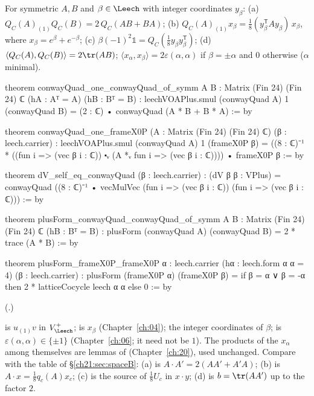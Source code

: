\begin{theorem}\label{ch21:thm:conway}
For symmetric $A,B$ and $\beta\in\Leech$ with integer coordinates $y_\beta$:
(a) $Q_C(A)_{(1)}Q_C(B)=2\,Q_C(AB+BA)$;
(b) $Q_C(A)_{(1)}x_\beta=\tfrac18(y_\beta^{\mathsf T}Ay_\beta)\,x_\beta$, where $x_\beta=e^\beta+e^{-\beta}$;
(c) $\beta(-1)^2\mathbb1=Q_C(\tfrac18y_\beta y_\beta^{\mathsf T})$;
(d) $\langle Q_C(A),Q_C(B)\rangle=2\tr(AB)$; $\langle x_\alpha,x_\beta\rangle=2\varepsilon(\alpha,\alpha)$ if
$\beta=\pm\alpha$ and $0$ otherwise ($\alpha$ minimal).
\end{theorem}
\begin{leancode}
theorem conwayQuad_one_conwayQuad_of_symm {A B : Matrix (Fin 24) (Fin 24) ℂ} (hA : Aᵀ = A)
    (hB : Bᵀ = B) :
    leechVOAPlus.smul (conwayQuad A) 1 (conwayQuad B) = (2 : ℂ) • conwayQuad (A * B + B * A) := by
\end{leancode}
\begin{leancode}
theorem conwayQuad_one_frameX0P (A : Matrix (Fin 24) (Fin 24) ℂ) (β : leech.carrier) :
    leechVOAPlus.smul (conwayQuad A) 1 (frameX0P β)
      = ((8 : ℂ)⁻¹ * ((fun i => (vec β i : ℂ)) ⬝ᵥ (A *ᵥ fun i => (vec β i : ℂ)))) • frameX0P β := by
\end{leancode}
\begin{leancode}
theorem dV_self_eq_conwayQuad (β : leech.carrier) :
    (dV β β : VPlus)
      = conwayQuad ((8 : ℂ)⁻¹ • vecMulVec (fun i => (vec β i : ℂ)) (fun i => (vec β i : ℂ))) := by
\end{leancode}
\begin{leancode}
theorem plusForm_conwayQuad_conwayQuad_of_symm {A B : Matrix (Fin 24) (Fin 24) ℂ}
    (hB : Bᵀ = B) : plusForm (conwayQuad A) (conwayQuad B) = 2 * trace (A * B) := by
\end{leancode}
\begin{leancode}
theorem plusForm_frameX0P_frameX0P {α : leech.carrier} (hα : leech.form α α = 4)
    (β : leech.carrier) :
    plusForm (frameX0P α) (frameX0P β)
      = if β = α ∨ β = -α then 2 * latticeCocycle leech α α else 0 := by
\end{leancode}
(.)
\begin{dictionary}
 is $u_{(1)}v$ in $V_\Leech^+$;  is $x_\beta$
(Chapter~\ref{ch:04});  the integer coordinates of $\beta$; 
is $\varepsilon(\alpha,\alpha)\in\{\pm1\}$ (Chapter~\ref{ch:06}; it need not be $1$).  The products of the
$x_\alpha$ among themselves are lemmas of  (Chapter~\ref{ch:20}),
used unchanged.  Compare with the table of \S\ref{ch21:sec:spaceB}: (a) is $A\cdot A'=2(AA'+A'A)$; (b)
is $A\cdot x=\tfrac18q_c(A)x_c$; (c) is the source of $\tfrac18U_c$ in $x\cdot y$; (d) is $b=\tr(AA')$
up to the factor $2$.
\end{dictionary}
